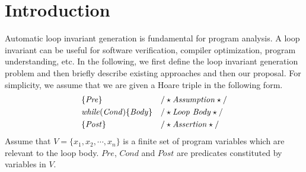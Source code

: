 
\section{Introduction} %
\label{sec:introduction}

Automatic loop invariant generation is fundamental for program analysis. A loop invariant can be useful for software verification, compiler optimization, program understanding, etc. In the following, we first define the loop invariant generation problem and then briefly describe existing approaches and then our proposal. For simplicity, we assume that we are given a Hoare triple in the following form. 
\begin{align*}
&\{\mathit{Pre}\} & & /\star\text{\emph{Assumption}}\star/ \\
&\mathit{while} (\mathit{Cond}) \{ \mathit{Body} \} && /\star\text{\emph{Loop Body}}\star/\\
&\{\mathit{Post}\} & & /\star\text{\emph{Assertion}}\star/
\end{align*}
Assume that $V = \{x_1{,} x_2{,} \cdots{,} x_n\}$ is a finite set of program variables which are relevant to the loop body. $\mathit{Pre}$, $\mathit{Cond}$ and $\mathit{Post}$ are predicates constituted by variables in $V$.

